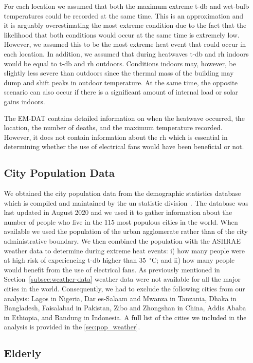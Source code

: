 For each location we assumed that both the maximum extreme \ac{t-db} and wet-bulb temperatures could be recorded at the same time.
This is an approximation and it is arguably overestimating the most extreme condition due to the fact that the likelihood that both conditions would occur at the same time is extremely low.
However, we assumed this to be the most extreme heat event that could occur in each location.
In addition, we assumed that during heatwaves \ac{t-db} and \ac{rh} indoors would be equal to \ac{t-db} and \ac{rh} outdoors.
Conditions indoors may, however, be slightly less severe than outdoors since the thermal mass of the building may dump and shift peaks in outdoor temperature.
At the same time, the opposite scenario can also occur if there is a significant amount of internal load or solar gains indoors.

The EM-DAT contains detailed information on when the heatwave occurred, the location, the number of deaths, and the maximum temperature recorded.
However, it does not contain information about the \ac{rh} which is essential in determining whether the use of electrical fans would have been beneficial or not.

\subsection{City Population Data}\label{subsec:population-data}

We obtained the city population data from the demographic statistics database which is compiled and maintained by the \ac{un} statistic division~\cite{UNdatare88:online}.
The database was last updated in August 2020 and we used it to gather information about the number of people who live in the 115 most populous cities in the world.
When available we used the population of the urban agglomerate rather than of the city administrative boundary.
We then combined the population with the ASHRAE weather data to determine during extreme heat events: i) how many people were at high risk of experiencing \ac{t-db} higher than 35~$^{\circ}$C\@; and ii) how many people would benefit from the use of electrical fans.
As previously mentioned in Section~\ref{subsec:weather-data} weather data were not available for all the major cities in the world.
Consequently, we had to exclude the following cities from our analysis: Lagos in Nigeria, Dar es-Salaam and Mwanza in Tanzania, Dhaka in Bangladesh, Faisalabad in Pakistan, Zibo and Zhongshan in China, Addis Ababa in Ethiopia, and Bandung in Indonesia.
A full list of the cities we included in the analysis is provided in the \ref{sec:pop_weather}.

\subsection{Elderly}\label{subsec:elderly}

